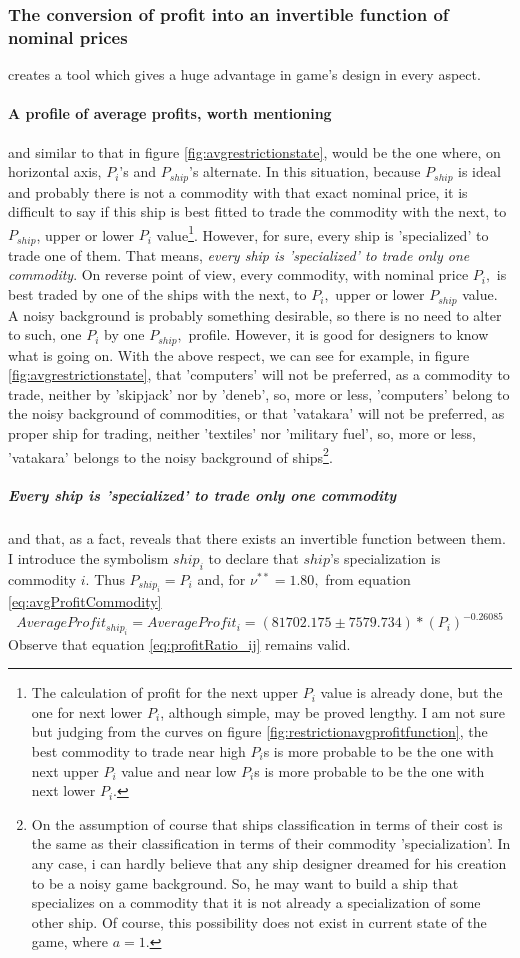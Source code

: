 \documentclass[]{article}
\begin{document}
\subsubsection{The conversion of profit into an invertible function of nominal prices} creates a tool which gives a huge advantage in game's design in every aspect.
\paragraph{A profile of average profits, worth mentioning} and similar to that in figure \ref{fig:avgrestrictionstate}, would be the one where, on horizontal axis, $P_{i}$'s and $P_{ship}$'s alternate. In this situation, because $P_{ship}$ is ideal and probably there is not a commodity with that exact nominal price, it is difficult to say if this ship is best fitted to trade the commodity with the next, to $P_{ship}$, upper or lower $P_{i}$ value\footnote{The calculation of profit for the next upper $P_{i}$ value is already done, but the one for next lower $P_{i}$, although simple, may be proved lengthy. I am not sure but judging from the curves on figure \ref{fig:restrictionavgprofitfunction}, the best commodity to trade near high $P_{i}$s is more probable to be the one with next upper $P_{i}$ value and near low $P_{i}$s is more probable to be the one with next lower $P_{i}.$}. However, for sure, every ship is 'specialized' to trade one of them. That means, \emph{every ship is 'specialized' to trade only one commodity}. On reverse point of view, every commodity, with nominal price $P_{i},$ is best traded by one of the ships with the next, to $P_{i},$ upper or lower $P_{ship}$ value. A noisy background is probably something desirable, so there is no need to alter to such, one $P_{i}$ by one $P_{ship},$ profile. However, it is good for designers to know what is going on. With the above respect, we can see for example, in figure \ref{fig:avgrestrictionstate}, that 'computers' will not be preferred, as a commodity to trade, neither by 'skipjack' nor by 'deneb', so, more or less, 'computers' belong to the noisy background of commodities, or that 'vatakara' will not be preferred, as proper ship for trading, neither 'textiles' nor 'military fuel', so, more or less, 'vatakara' belongs to the noisy background of ships\footnote{On the assumption of course that ships classification in terms of their cost is the same as their classification in terms of their commodity 'specialization'. In any case, i can hardly believe that any ship designer dreamed for his creation to be a noisy game background. So, he may want to build a ship that specializes on a commodity that it is not already a specialization of some other ship. Of course, this possibility does not exist in current state of the game, where $a=1$.}. 
\subparagraph{Every ship is 'specialized' to trade only one commodity} and that, as a fact, reveals that there exists an invertible function between them. I introduce the symbolism $ship_{i}$ to declare that $ship$'s specialization is commodity $i.$ Thus $P_{ship_{i}}=P_{i}$ and, for $\nu^{**}=1.80,$ from equation \eqref{eq:avgProfitCommodity} 
\[ AverageProfit_{ship_{i}}=AverageProfit_{i}=
(81702.175\pm7579.734)*(P_{i})^{-0.26085}
\]
Observe that equation \eqref{eq:profitRatio_ij} remains valid.
\end{document}
